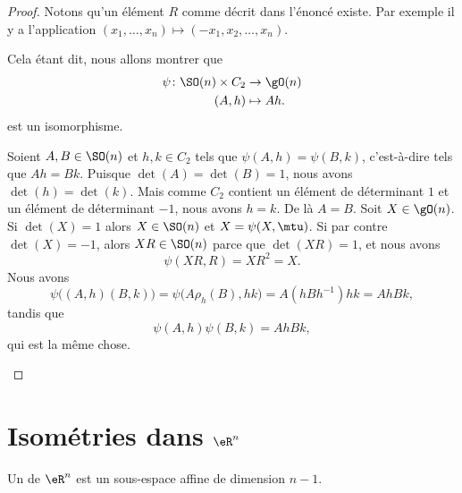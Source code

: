\begin{proof}
	Notons qu'un élément \( R\) comme décrit dans l'énoncé existe. Par exemple il y a l'application  \( (x_1,\ldots, x_n)\mapsto (-x_1,x_2,\ldots, x_n)\).

	Cela étant dit, nous allons montrer que
	\begin{equation}
		\begin{aligned}
			\psi\colon \SO(n)\times C_2 & \to \gO(n)  \\
			(A,h)                       & \mapsto Ah.
		\end{aligned}
	\end{equation}
	est un isomorphisme.
	\begin{subproof}
		\spitem[Injectif]
		Soient \( A,B\in \SO(n)\) et \( h,k\in C_2\) tels que \( \psi(A,h)=\psi(B,k)\), c'est-à-dire tels que \( Ah=Bk\). Puisque \( \det(A)=\det(B)=1\), nous avons \( \det(h)=\det(k)\). Mais comme \( C_2\) contient un élément de déterminant \( 1\) et un élément de déterminant \( -1\), nous avons \( h=k\). De là \( A=B\).
		\spitem[Surjectif]
		Soit \( X\in\gO(n)\). Si \( \det(X)=1\) alors \( X\in \SO(n)\) et \( X=\psi(X,\mtu)\). Si par contre \( \det(X)=-1\), alors \( XR\in\SO(n)\) parce que \( \det(XR)=1\), et nous avons
		\begin{equation}
			\psi(XR,R)=XR^2=X.
		\end{equation}
		\spitem[Morphisme]
		Nous avons
		\begin{equation}
			\psi\Big( (A,h)(B,k) \Big)=\psi\big( A\rho_h(B),hk \big)=A(hBh^{-1})hk=AhBk,
		\end{equation}
		tandis que
		\begin{equation}
			\psi(A,h)\psi(B,k)=AhBk,
		\end{equation}
		qui est la même chose.
	\end{subproof}
\end{proof}

\section{Isométries dans \( \eR^n\)}

\begin{definition}
	Un  de \( \eR^n\) est un sous-espace affine de dimension \( n-1\).
\end{definition}

